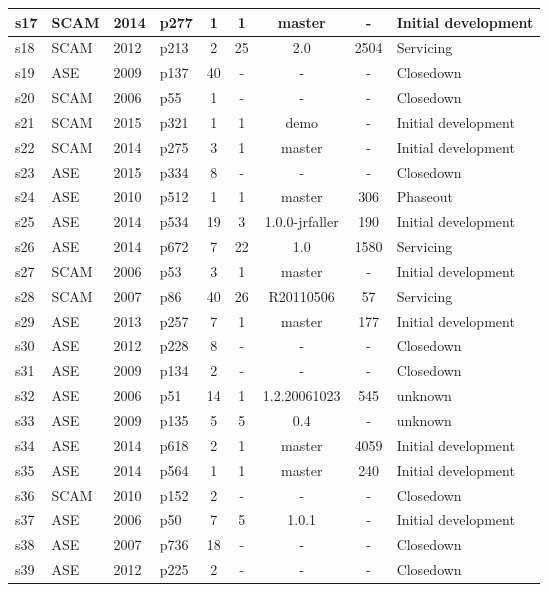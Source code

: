\begin{longtable}{| l | l | l | l | c | c | c | c | l |}
    \hline
s17 & SCAM & 2014 & p277 & 1 & 1 & master & - & Initial development \\
    \hline
s18 & SCAM & 2012 & p213 & 2 & 25 & 2.0 & 2504 & Servicing \\
    \hline
s19 & ASE & 2009 & p137 & 40 & - & - & - & Closedown \\
    \hline
s20 & SCAM & 2006 & p55 & 1 & - & - & - & Closedown \\
    \hline
s21 & SCAM & 2015 & p321 & 1 & 1 & demo & - & Initial development \\
    \hline
s22 & SCAM & 2014 & p275 & 3 & 1 & master & - & Initial development \\
    \hline
s23 & ASE & 2015 & p334 & 8 & - & - & - & Closedown \\
    \hline
s24 & ASE & 2010 & p512 & 1 & 1 & master & 306 & Phaseout \\
    \hline
s25 & ASE & 2014 & p534 & 19 & 3 & 1.0.0-jrfaller & 190 & Initial development \\
    \hline
s26 & ASE & 2014 & p672 & 7 & 22 & 1.0 & 1580 & Servicing \\
    \hline
s27 & SCAM & 2006 & p53 & 3 & 1 & master & - & Initial development \\
    \hline
s28 & SCAM & 2007 & p86 & 40 & 26 & R20110506 & 57 & Servicing \\
    \hline
s29 & ASE & 2013 & p257 & 7 & 1 & master & 177 & Initial development \\
    \hline
s30 & ASE & 2012 & p228 & 8 & - & - & - & Closedown \\
    \hline
s31 & ASE & 2009 & p134 & 2 & - & - & - & Closedown \\
    \hline
s32 & ASE & 2006 & p51 & 14 & 1 & 1.2.20061023 & 545 & unknown \\
    \hline
s33 & ASE & 2009 & p135 & 5 & 5 & 0.4 & - & unknown \\
    \hline
s34 & ASE & 2014 & p618 & 2 & 1 & master & 4059 & Initial development \\
    \hline
s35 & ASE & 2014 & p564 & 1 & 1 & master & 240 & Initial development \\
    \hline
s36 & SCAM & 2010 & p152 & 2 & - & - & - & Closedown \\
    \hline
s37 & ASE & 2006 & p50 & 7 & 5 & 1.0.1 & - & Initial development \\
    \hline
s38 & ASE & 2007 & p736 & 18 & - & - & - & Closedown \\
    \hline
s39 & ASE & 2012 & p225 & 2 & - & - & - & Closedown \\

\end{longtable}
